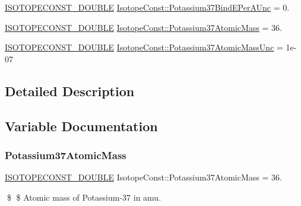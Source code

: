 \begin{DoxyCompactItemize}
\mbox{\hyperlink{group___isotope_const-_macros_ga8f45a7272ce02c0b4c65c44636ed719a}{I\+S\+O\+T\+O\+P\+E\+C\+O\+N\+S\+T\+\_\+\+D\+O\+U\+B\+LE}} \mbox{\hyperlink{group___isotope_const-_potassium-_k37_ga1bf118953c4d58339e91750a441facc4}{Isotope\+Const\+::\+Potassium37\+Bind\+E\+Per\+A\+Unc}} = 0.
\item 
\mbox{\hyperlink{group___isotope_const-_macros_ga8f45a7272ce02c0b4c65c44636ed719a}{I\+S\+O\+T\+O\+P\+E\+C\+O\+N\+S\+T\+\_\+\+D\+O\+U\+B\+LE}} \mbox{\hyperlink{group___isotope_const-_potassium-_k37_ga191b9c293b1f86382ce3cbc6acb2898d}{Isotope\+Const\+::\+Potassium37\+Atomic\+Mass}} = 36.
\item 
\mbox{\hyperlink{group___isotope_const-_macros_ga8f45a7272ce02c0b4c65c44636ed719a}{I\+S\+O\+T\+O\+P\+E\+C\+O\+N\+S\+T\+\_\+\+D\+O\+U\+B\+LE}} \mbox{\hyperlink{group___isotope_const-_potassium-_k37_gaadbfe934e7193b3433f50d70c52f9322}{Isotope\+Const\+::\+Potassium37\+Atomic\+Mass\+Unc}} = 1e-\/07
\end{DoxyCompactItemize}


\subsection{Detailed Description}


\subsection{Variable Documentation}
\mbox{\label{group___isotope_const-_potassium-_k37_ga191b9c293b1f86382ce3cbc6acb2898d}} 
\subsubsection{\texorpdfstring{Potassium37\+Atomic\+Mass}{Potassium37AtomicMass}}
{\footnotesize\ttfamily \mbox{\hyperlink{group___isotope_const-_macros_ga8f45a7272ce02c0b4c65c44636ed719a}{I\+S\+O\+T\+O\+P\+E\+C\+O\+N\+S\+T\+\_\+\+D\+O\+U\+B\+LE}} Isotope\+Const\+::\+Potassium37\+Atomic\+Mass = 36.}

\$ \$ Atomic mass of Potassium-\/37 in amu. \mbox{\label{group___isotope_const-_potassium-_k37_gaadbfe934e7193b3433f50d70c52f9322}} 
